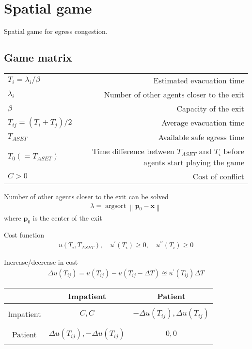\section{Spatial game}
Spatial game for egress congestion.

\subsection{Game matrix}
\begin{tabularx}{1.0\linewidth}{ l R }
$ T_{i} = \lambda_{i} / \beta $ &  Estimated evacuation time \\
$ \lambda_{i} $ & Number of other agents closer to the exit \\
$ \beta $ & Capacity of the exit \\
$ T_{ij} = \left(T_{i} + T_{j}\right) / 2 $ & Average evacuation time \\
$ T_{ASET} $ & Available safe egress time \\
$ T_{0}( = T_{ASET}) $ & Time difference between $ T_{ASET} $ and $ T_{i} $ before agents start playing the game \\
$ C > 0 $ & Cost of conflict \\
\end{tabularx}

Number of other agents closer to the exit can be solved 
\begin{align}
\lambda = \operatorname{argsort} \left\|\mathbf{p}_{0} - \mathbf{x} \right\|
\end{align}
where $ \mathbf{p}_{0} $ is the center of the exit

Cost function
\begin{align}
u(T_{i}, T_{ASET}), \quad u^{\prime}(T_{i}) \geq 0, \quad u^{\prime\prime}(T_{i}) \geq 0
\end{align}

Increase/decrease in cost
\begin{align}
\Delta u(T_{ij}) = u(T_{ij}) - u(T_{ij} - \Delta T) \approxeq u^{\prime}(T_{ij}) \Delta T
\end{align}


\begin{tabularx}{1.0\linewidth}{ c | C | C }
& Impatient & Patient \\
\hline
&& \\
Impatient & $ C, C $ & $ -\Delta u(T_{ij}), \Delta u(T_{ij}) $ \\
&& \\
\hline
&& \\
Patient & $ \Delta u(T_{ij}), -\Delta u(T_{ij}) $ & $ 0, 0 $ \\
&& \\
\end{tabularx}

